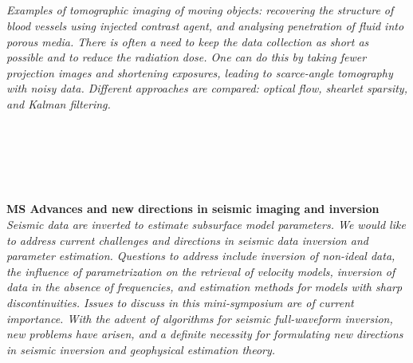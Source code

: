 \begin{multicols}{2}
        \\\\
        \\
        \\\\
        \\
        \\\\
\\
      \textit{Examples of tomographic imaging of moving objects: recovering the structure of blood vessels using injected contrast agent, and analysing penetration of fluid into porous media. There is often a need to keep the data collection as short as possible and to reduce the radiation dose. One can do this by taking fewer projection images and shortening exposures, leading to scarce-angle tomography with noisy data. Different approaches are compared: optical flow, shearlet sparsity, and Kalman filtering.}\\
\\ 
        \\
        \\\\
\\
\end{multicols}
  \noindent\textbf{MS Advances and new directions in seismic imaging and inversion}\\
  \textit{Seismic data are inverted to estimate subsurface model parameters.  We would like to address current challenges and directions in seismic data inversion and parameter estimation. Questions to address include inversion of non-ideal data, the influence of parametrization on the retrieval of velocity models,  inversion of data in the absence of frequencies,  and estimation methods for models with sharp discontinuities.  Issues to discuss in this mini-symposium are of current importance. With the advent of algorithms for seismic full-waveform inversion, new problems have arisen, and a definite necessity for formulating new directions in seismic inversion and geophysical estimation theory.} \\
    
